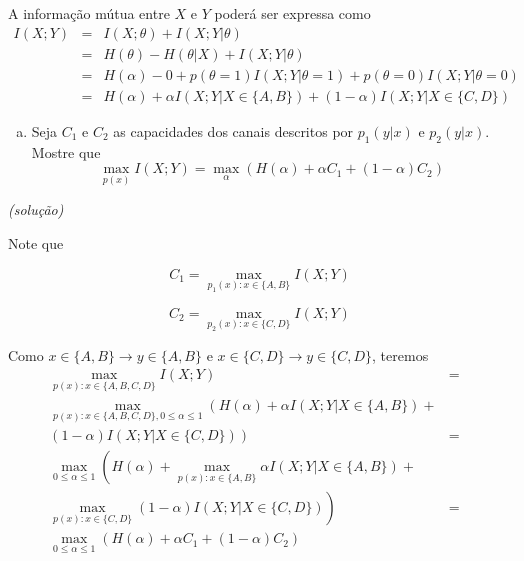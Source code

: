 \begin{frame}[allowframebreaks]
\begin{exercise}
  \exercisebreak
  A informação mútua entre $X$ e $Y$ poderá ser expressa como
  \begin{eqnarray}
  I(X;Y) &=& I(X; \theta) + I(X;Y|\theta) \nonumber \\
	&=& H(\theta) - H(\theta | X) + I(X;Y|\theta) \nonumber \\
	&=& H(\alpha) - 0 + p(\theta=1) I(X;Y|\theta=1) + p(\theta=0) I(X;Y | \theta = 0) \nonumber \\
	&=& H(\alpha) + \alpha I(X;Y|X\in\{A,B\}) + (1-\alpha) I(X;Y|X\in\{C,D\})
  \end{eqnarray}


  \exercisebreak
  \begin{enumerate}[d)]
  \item Seja $C_1$ e $C_2$ as capacidades dos canais descritos por $p_1(y|x)$ e $p_2(y|x)$.
  Mostre que 
  	\begin{equation}
	\max_{p(x)} I(X;Y) = \max_{\alpha} \left( H(\alpha) + \alpha C_1 +(1-\alpha) C_2 \right)
	\end{equation}
  \end{enumerate}
  \textit{(solução)}

  Note que 
  \noindent\begin{minipage}{.5\linewidth}
  \begin{equation}
  C_1 = \max_{p_1(x) : x\in\{A,B\}} I(X;Y) 
  \end{equation}
  \end{minipage}%
  \begin{minipage}{.5\linewidth}
  \begin{equation} 
  C_2 = \max_{p_2(x):x\in\{C,D\}} I(X;Y)
  \end{equation}
  \end{minipage}
 
  \exercisebreak

  Como $x \in \{A,B\} \rightarrow y \in \{A,B\}$ e $x \in \{C,D\} \rightarrow y \in \{C,D\}$,
  teremos 
  \begin{eqnarray}
  \max_{p(x):x\in\{A,B,C,D\}} I(X;Y) &=& \nonumber \\
	\max_{p(x):x\in\{A,B,C,D\}, 0\leq \alpha \leq 1} 
	\left( H(\alpha) + \alpha I(X;Y|X\in\{A,B\}) + \right.  && \nonumber \\ \left. (1-\alpha) I(X;Y|X\in\{C,D\}) \right) &=& \nonumber \\
	\max_{0\leq \alpha \leq 1} \left( H(\alpha) + 
		\max_{p(x):x\in\{A,B\}} \alpha I(X;Y | X \in \{A,B\}) + \right.  && \nonumber \\ \left. 
		\max_{p(x):x\in\{C,D\}} (1-\alpha) I(X;Y | X \in \{C,D\}) \right) &=& \nonumber \\
	 \max_{0\leq \alpha \leq 1} \left( H(\alpha) + \alpha C_1 + (1-\alpha) C_2 \right)
  \end{eqnarray}



\end{exercise}
\end{frame}
